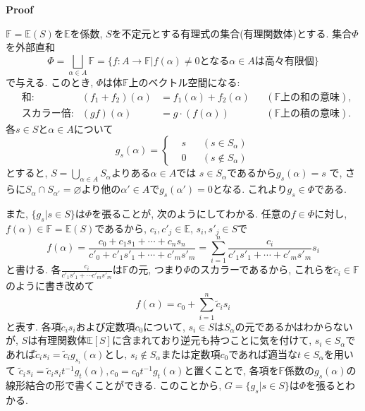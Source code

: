 \documentclass[a4paper]{ujarticle}
\makeatletter
\numberwithin{equation}{section}
\theoremstyle{definition}
\renewenvironment{proof}[1][Proof]{\par
  \pushQED{\qed}%
  \normalfont \topsep6\p@\@plus6\p@\relax
  \trivlist
  \item\relax
  {\bfseries
  #1\@addpunct{.}}\hspace\labelsep\ignorespaces
}{%
  \popQED\endtrivlist\@endpefalse
}
\makeatother
\begin{document}
\begin{proof}
\begin{itemize}
            $\mathbb{F} = \mathbb{E}(S)$を$\mathbb{E}$を係数, $S$を不定元とする有理式の集合(有理関数体)とする.
            集合$\Phi$を外部直和
            \[
                \Phi = \bigsqcup_{\alpha \in A} \mathbb{F} = \{f: A \rightarrow \mathbb{F}| f(\alpha) \neq 0 \text{となる$\alpha \in A$は高々有限個} \}
            \]
            で与える.
            このとき, $\Phi$は体$\mathbb{F}$上のベクトル空間になる:
            \begin{align}
                &\text{和:} &(f_1 + f_2)(\alpha) &= f_1(\alpha) + f_2(\alpha) &&(\text{$\mathbb{F}$上の和の意味}),\\
                &\text{スカラー倍:} &(gf)(\alpha) &= g \cdot (f(\alpha)) &&(\text{$\mathbb{F}$上の積の意味}).
            \end{align}
            各$s \in S$と$\alpha \in A$について
            \[
                g_s(\alpha) = \left\{
                \begin{aligned}
                    &s &&(s \in S_{\alpha}) \\
                    &0 &&(s \notin S_{\alpha})
                \end{aligned}
                \right.
            \]
            とすると, $\displaystyle S = \bigcup_{\alpha \in A} S_{\alpha}$よりある$\alpha \in A$では
            $s \in S_{\alpha}$であるから$g_s(\alpha) = s$ で,
            さらに$S_{\alpha} \cap S_{\alpha'} = \varnothing$より他の$\alpha' \in A$で$g_s(\alpha') = 0$となる.
            これより$g_s \in \Phi$である. 
            
            また, $\{g_s | s \in S \}$は$\Phi$を張ることが, 次のようにしてわかる.
            任意の$f \in \Phi$に対し, $f(\alpha) \in \mathbb{F} = \mathbb{E}(S)$であるから, 
            $c_i, c'_j \in \mathbb{E}$, $s_i, s'_j \in S$で
            \[
                f(\alpha) = \frac{c_0 + c_1 s_1 + \cdots + c_n s_n}{c'_0 + c'_1 s'_1 + \cdots + c'_m s'_m} = \sum_{i = 1}^{n} \frac{c_i}{c'_1 s'_1 + \cdots + c'_m s'_m} s_i
            \]
            と書ける. 各$\displaystyle \frac{c_i}{c'_1 s'_1 + \cdots c'_m s'_m}$は$\mathbb{F}$の元, 
            つまり$\Phi$のスカラーであるから, 
            これらを$\tilde{c}_i \in \mathbb{F}$のように書き改めて
            \[
                f(\alpha) = c_0 + \sum_{i = 1}^{n} \tilde{c}_i s_i
            \]
            と表す. 各項$\tilde{c}_i s_i$および定数項$c_0$について,
            $s_i \in S$は$S_{\alpha}$の元であるかはわからないが, 
            $S$は有理関数体$\mathbb{E}[S]$に含まれており逆元も持つことに気を付けて,
            $s_i \in S_{\alpha}$であれば$\tilde{c}_i s_i = \tilde{c}_i g_{s_i}(\alpha)$とし,
            $s_i \notin S_{\alpha}$または定数項$c_0$であれば適当な$t \in S_{\alpha}$を用いて
            $\tilde{c}_i s_i = \tilde{c}_i s_i t^{-1} g_{t}(\alpha), c_0 = c_0 t^{-1} g_{t}(\alpha)$と置くことで,
            各項を$\mathbb{F}$係数の$g_s(\alpha)$の線形結合の形で書くことができる.
            このことから, $G = \{g_s | s \in S \}$は$\Phi$を張るとわかる.


\end{itemize}
\end{proof}
\end{document}
